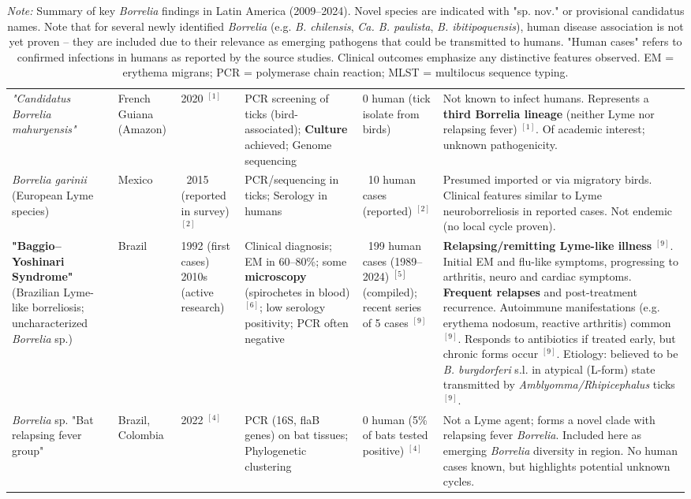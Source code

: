 \documentclass[11pt,letterpaper]{article}
\newcommand{\mycite}[1]{$^{[#1]}$}
\begin{document}
\begin{table}[H]
{\begin{tabular}{@{}lllllp{4cm}@{}}
\addlinespace[3pt]
\textit{"Candidatus Borrelia mahuryensis"} & French Guiana (Amazon) & 2020 \mycite{1} & PCR screening of ticks (bird-associated); \textbf{Culture} achieved; Genome sequencing & 0 human (tick isolate from birds) & Not known to infect humans. Represents a \textbf{third Borrelia lineage} (neither Lyme nor relapsing fever) \mycite{1}. Of academic interest; unknown pathogenicity. \\
\addlinespace[3pt]
\textit{Borrelia garinii} (European Lyme species) & Mexico & ~2015 (reported in survey) \mycite{2} & PCR/sequencing in ticks; Serology in humans & ~10 human cases (reported) \mycite{2} & Presumed imported or via migratory birds. Clinical features similar to Lyme neuroborreliosis in reported cases. Not endemic (no local cycle proven). \\
\addlinespace[3pt]
\textbf{"Baggio–Yoshinari Syndrome"} (Brazilian Lyme-like borreliosis; uncharacterized \textit{Borrelia} sp.) & Brazil & 1992 (first cases) 2010s (active research) & Clinical diagnosis; EM in 60–80\%; some \textbf{microscopy} (spirochetes in blood) \mycite{6}; low serology positivity; PCR often negative & ~199 human cases (1989–2024) \mycite{5} (compiled); recent series of 5 cases \mycite{9} & \textbf{Relapsing/remitting Lyme-like illness} \mycite{9}. Initial EM and flu-like symptoms, progressing to arthritis, neuro and cardiac symptoms. \textbf{Frequent relapses} and post-treatment recurrence. Autoimmune manifestations (e.g. erythema nodosum, reactive arthritis) common \mycite{9}. Responds to antibiotics if treated early, but chronic forms occur \mycite{9}. Etiology: believed to be \textit{B. burgdorferi} s.l. in atypical (L-form) state transmitted by \textit{Amblyomma/Rhipicephalus} ticks \mycite{9}. \\
\addlinespace[3pt]
\textit{Borrelia} sp. "Bat relapsing fever group" & Brazil, Colombia & 2022 \mycite{4} & PCR (16S, flaB genes) on bat tissues; Phylogenetic clustering & 0 human (5\% of bats tested positive) \mycite{4} & Not a Lyme agent; forms a novel clade with relapsing fever \textit{Borrelia}. Included here as emerging \textit{Borrelia} diversity in region. No human cases known, but highlights potential unknown cycles. \\ \bottomrule
\end{tabular}%
}
\caption*{\small\textit{Note:} Summary of key \textit{Borrelia} findings in Latin America (2009–2024). Novel species are indicated with "sp. nov." or provisional candidatus names. Note that for several newly identified \textit{Borrelia} (e.g. \textit{B. chilensis}, \textit{Ca. B. paulista}, \textit{B. ibitipoquensis}), human disease association is not yet proven – they are included due to their relevance as emerging pathogens that could be transmitted to humans. "Human cases" refers to confirmed infections in humans as reported by the source studies. Clinical outcomes emphasize any distinctive features observed. EM = erythema migrans; PCR = polymerase chain reaction; MLST = multilocus sequence typing.}
\end{table}
\end{document}
